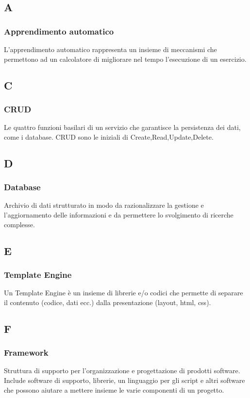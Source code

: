 \subsection*{A}
	\subsubsection*{Apprendimento automatico}
	L'apprendimento automatico rappresenta un insieme di meccanismi che permettono ad un calcolatore
	di migliorare nel tempo l'esecuzione di un esercizio.
	
	\subsection*{C}
	\subsubsection*{CRUD}
	Le quattro funzioni basilari di un servizio che garantisce la persistenza dei dati, come i database.
	CRUD sono le iniziali di Create,Read,Update,Delete.
	
	\subsection*{D}
	\subsubsection*{Database}
	Archivio di dati strutturato in modo da razionalizzare la gestione e l'aggiornamento delle informazioni e da permettere lo svolgimento di ricerche complesse.
	
	\subsection*{E}
	\subsubsection*{Template Engine}
	Un Template Engine è un insieme di librerie e/o codici che permette di separare il contenuto (codice, dati ecc.) dalla presentazione (layout, html, css).
	
	\subsection*{F}
	\subsubsection*{Framework}
	Struttura di supporto per l'organizzazione e progettazione di prodotti software. Include software di supporto, librerie, un linguaggio per gli script e altri software che possono aiutare a mettere insieme le varie componenti di un progetto.
	

